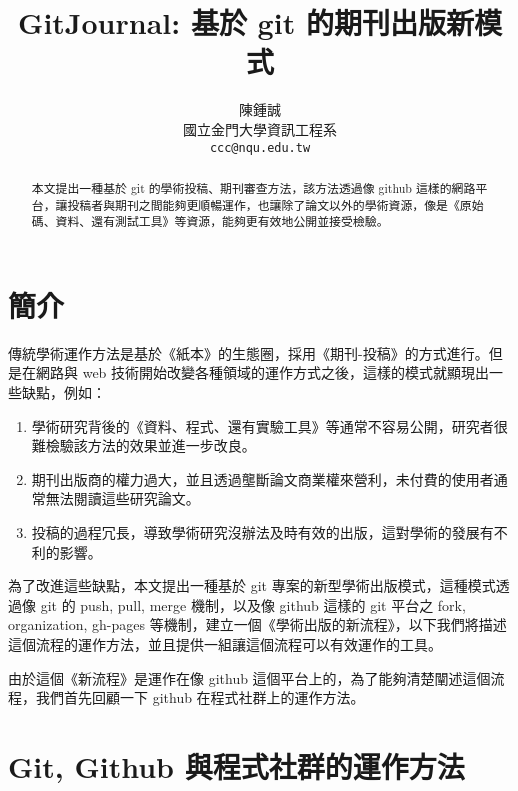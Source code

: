 \documentclass{article}
\title{GitJournal: 基於 git 的期刊出版新模式}
\author{
      陳鍾誠 \\
    國立金門大學資訊工程系 \\
    \texttt{ccc@nqu.edu.tw} \\
    \And
  }
\providecommand{\tightlist}{%
  \setlength{\itemsep}{0pt}\setlength{\parskip}{0pt}}
\begin{document}
\maketitle

\begin{abstract}
  本文提出一種基於 git 的學術投稿、期刊審查方法，該方法透過像 github
  這樣的網路平台，讓投稿者與期刊之間能夠更順暢運作，也讓除了論文以外的學術資源，像是《原始碼、資料、還有測試工具》等資源，能夠更有效地公開並接受檢驗。
\end{abstract}


\hypertarget{ux7c21ux4ecb}{%
\section{簡介}\label{ux7c21ux4ecb}}

傳統學術運作方法是基於《紙本》的生態圈，採用《期刊-投稿》的方式進行。但是在網路與
web
技術開始改變各種領域的運作方式之後，這樣的模式就顯現出一些缺點，例如：

\begin{enumerate}
\def\labelenumi{\arabic{enumi}.}
\tightlist
\item
  學術研究背後的《資料、程式、還有實驗工具》等通常不容易公開，研究者很難檢驗該方法的效果並進一步改良。
\item
  期刊出版商的權力過大，並且透過壟斷論文商業權來營利，未付費的使用者通常無法閱讀這些研究論文。
\item
  投稿的過程冗長，導致學術研究沒辦法及時有效的出版，這對學術的發展有不利的影響。
\end{enumerate}

為了改進這些缺點，本文提出一種基於 git
專案的新型學術出版模式，這種模式透過像 git 的 push, pull, merge
機制，以及像 github 這樣的 git 平台之 fork, organization, gh-pages
等機制，建立一個《學術出版的新流程》，以下我們將描述這個流程的運作方法，並且提供一組讓這個流程可以有效運作的工具。

由於這個《新流程》是運作在像 github
這個平台上的，為了能夠清楚闡述這個流程，我們首先回顧一下 github
在程式社群上的運作方法。

\hypertarget{git-github-ux8207ux7a0bux5f0fux793eux7fa4ux7684ux904bux4f5cux65b9ux6cd5}{%
\section{Git, Github
與程式社群的運作方法}\label{git-github-ux8207ux7a0bux5f0fux793eux7fa4ux7684ux904bux4f5cux65b9ux6cd5}}
\end{document}
